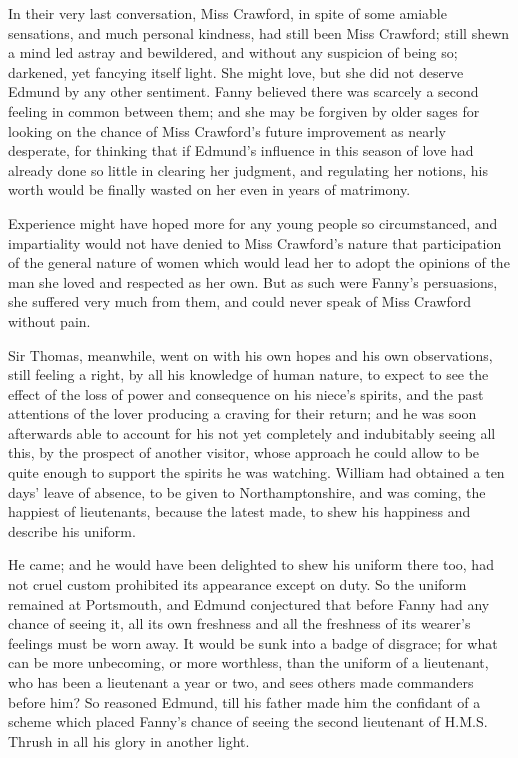 In their very last conversation, Miss Crawford, in spite
of some amiable sensations, and much personal kindness,
had still been Miss Crawford; still shewn a mind led astray
and bewildered, and without any suspicion of being so;
darkened, yet fancying itself light.  She might love,
but she did not deserve Edmund by any other sentiment.
Fanny believed there was scarcely a second feeling
in common between them; and she may be forgiven by older
sages for looking on the chance of Miss Crawford's future
improvement as nearly desperate, for thinking that if Edmund's
influence in this season of love had already done so little
in clearing her judgment, and regulating her notions,
his worth would be finally wasted on her even in years
of matrimony.

Experience might have hoped more for any young people
so circumstanced, and impartiality would not have denied
to Miss Crawford's nature that participation of the general
nature of women which would lead her to adopt the opinions
of the man she loved and respected as her own.  But as such
were Fanny's persuasions, she suffered very much from them,
and could never speak of Miss Crawford without pain.

Sir Thomas, meanwhile, went on with his own hopes and
his own observations, still feeling a right, by all his
knowledge of human nature, to expect to see the effect
of the loss of power and consequence on his niece's spirits,
and the past attentions of the lover producing a craving
for their return; and he was soon afterwards able to account
for his not yet completely and indubitably seeing all this,
by the prospect of another visitor, whose approach he
could allow to be quite enough to support the spirits
he was watching.  William had obtained a ten days'
leave of absence, to be given to Northamptonshire,
and was coming, the happiest of lieutenants, because the
latest made, to shew his happiness and describe his uniform.

He came; and he would have been delighted to shew his uniform
there too, had not cruel custom prohibited its appearance
except on duty.  So the uniform remained at Portsmouth,
and Edmund conjectured that before Fanny had any chance
of seeing it, all its own freshness and all the freshness
of its wearer's feelings must be worn away.  It would be sunk
into a badge of disgrace; for what can be more unbecoming,
or more worthless, than the uniform of a lieutenant,
who has been a lieutenant a year or two, and sees
others made commanders before him?  So reasoned Edmund,
till his father made him the confidant of a scheme which
placed Fanny's chance of seeing the second lieutenant
of H.M.S. Thrush in all his glory in another light.

